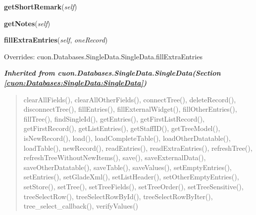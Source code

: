     \vspace{0.5ex}

\hspace{.8\funcindent}\begin{boxedminipage}{\funcwidth}

    \raggedright \textbf{getShortRemark}(\textit{self})

\setlength{\parskip}{2ex}
\setlength{\parskip}{1ex}
    \end{boxedminipage}

    \label{cuon:Addresses:SingleScheduling:SingleScheduling:getNotes}

    \vspace{0.5ex}

\hspace{.8\funcindent}\begin{boxedminipage}{\funcwidth}

    \raggedright \textbf{getNotes}(\textit{self})

\setlength{\parskip}{2ex}
\setlength{\parskip}{1ex}
    \end{boxedminipage}

    \vspace{0.5ex}

\hspace{.8\funcindent}\begin{boxedminipage}{\funcwidth}

    \raggedright \textbf{fillExtraEntries}(\textit{self}, \textit{oneRecord})

\setlength{\parskip}{2ex}
\setlength{\parskip}{1ex}
      Overrides: cuon.Databases.SingleData.SingleData.fillExtraEntries

    \end{boxedminipage}


\large{\textbf{\textit{Inherited from cuon.Databases.SingleData.SingleData\textit{(Section \ref{cuon:Databases:SingleData:SingleData})}}}}

\begin{quote}
clearAllFields(), clearAllOtherFields(), connectTree(), deleteRecord(), disconnectTree(), fillEntries(), fillExternalWidget(), fillOtherEntries(), fillTree(), findSingleId(), getEntries(), getFirstListRecord(), getFirstRecord(), getListEntries(), getStaffID(), getTreeModel(), isNewRecord(), load(), loadCompleteTable(), loadOtherDatatable(), loadTable(), newRecord(), readEntries(), readExtraEntries(), refreshTree(), refreshTreeWithoutNewItems(), save(), saveExternalData(), saveOtherDatatable(), saveTable(), saveValues(), setEmptyEntries(), setEntries(), setGladeXml(), setListHeader(), setOtherEmptyEntries(), setStore(), setTree(), setTreeFields(), setTreeOrder(), setTreeSensitive(), treeSelectRow(), treeSelectRowById(), treeSelectRowByIter(), tree\_select\_callback(), verifyValues()
\end{quote}


